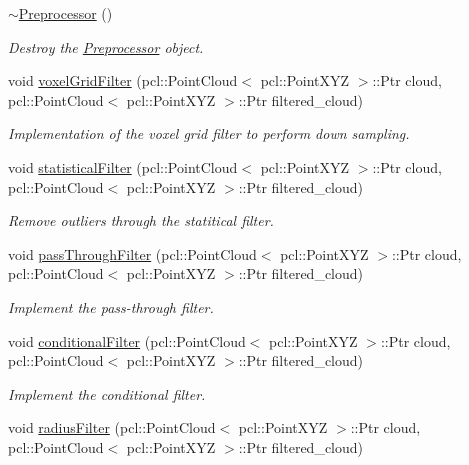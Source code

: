 \begin{DoxyCompactItemize}
\hyperlink{classhull__abstraction_1_1_preprocessor_a880dfe2a68232c6aea2ad41743df3d97}{$\sim$\+Preprocessor} ()
\begin{DoxyCompactList}\small\item\em Destroy the \hyperlink{classhull__abstraction_1_1_preprocessor}{Preprocessor} object. \end{DoxyCompactList}\item 
void \hyperlink{classhull__abstraction_1_1_preprocessor_a423d6c8cb5b08f8387290aae47184b3b}{voxel\+Grid\+Filter} (pcl\+::\+Point\+Cloud$<$ pcl\+::\+Point\+X\+YZ $>$\+::Ptr cloud, pcl\+::\+Point\+Cloud$<$ pcl\+::\+Point\+X\+YZ $>$\+::Ptr filtered\+\_\+cloud)
\begin{DoxyCompactList}\small\item\em Implementation of the voxel grid filter to perform down sampling. \end{DoxyCompactList}\item 
void \hyperlink{classhull__abstraction_1_1_preprocessor_a494877684eca0eaf7207c8655140b692}{statistical\+Filter} (pcl\+::\+Point\+Cloud$<$ pcl\+::\+Point\+X\+YZ $>$\+::Ptr cloud, pcl\+::\+Point\+Cloud$<$ pcl\+::\+Point\+X\+YZ $>$\+::Ptr filtered\+\_\+cloud)
\begin{DoxyCompactList}\small\item\em Remove outliers through the statitical filter. \end{DoxyCompactList}\item 
void \hyperlink{classhull__abstraction_1_1_preprocessor_a4912126b50bdac35c63f521e3bc04314}{pass\+Through\+Filter} (pcl\+::\+Point\+Cloud$<$ pcl\+::\+Point\+X\+YZ $>$\+::Ptr cloud, pcl\+::\+Point\+Cloud$<$ pcl\+::\+Point\+X\+YZ $>$\+::Ptr filtered\+\_\+cloud)
\begin{DoxyCompactList}\small\item\em Implement the pass-\/through filter. \end{DoxyCompactList}\item 
void \hyperlink{classhull__abstraction_1_1_preprocessor_a95229af873f6f1a74c832340f8f9b7bf}{conditional\+Filter} (pcl\+::\+Point\+Cloud$<$ pcl\+::\+Point\+X\+YZ $>$\+::Ptr cloud, pcl\+::\+Point\+Cloud$<$ pcl\+::\+Point\+X\+YZ $>$\+::Ptr filtered\+\_\+cloud)
\begin{DoxyCompactList}\small\item\em Implement the conditional filter. \end{DoxyCompactList}\item 
void \hyperlink{classhull__abstraction_1_1_preprocessor_aef6ccdc23a770af04eb6fc1d34aceff9}{radius\+Filter} (pcl\+::\+Point\+Cloud$<$ pcl\+::\+Point\+X\+YZ $>$\+::Ptr cloud, pcl\+::\+Point\+Cloud$<$ pcl\+::\+Point\+X\+YZ $>$\+::Ptr filtered\+\_\+cloud)

\end{DoxyCompactItemize}
